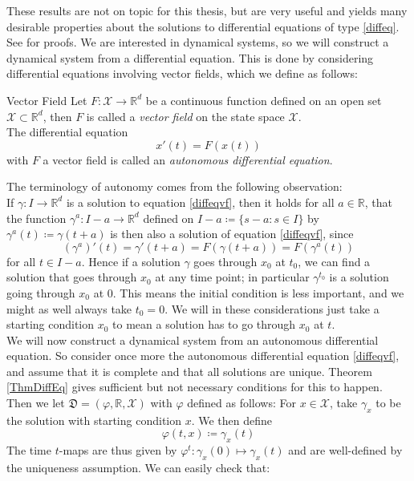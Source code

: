 \documentclass[11pt, a4paper]{memoir}
\theoremstyle{break}
\theoremstyle{break}
\theoremstyle{nonumberplain}
\newcommand{\mR}{\mathbb{R}}
\begin{document}
These results are not on topic for this thesis, but are very useful and yields many desirable properties about the solutions to differential equations of type \ref{diffeq}. See \cite{Dynamics} for proofs. We are interested in dynamical systems, so we will construct a dynamical system from a differential equation. This is done by considering differential equations involving vector fields, which we define as follows:
\begin{mydefinition}{Vector Field}
Let $F:\mathcal{X}\to\mR^d$ be a continuous function defined on an open set $\mathcal{X}\subset \mR^d$, then $F$ is called a \emph{vector field} on the state space $\mathcal{X}$.\\[5pt]
The differential equation
\begin{equation}\label{diffeqvf}
x'(t)=F(x(t))
\end{equation}
with $F$ a vector field is called an \emph{autonomous differential equation}.
\end{mydefinition}
\noindent The terminology of autonomy comes from the following observation:\\
If $\gamma:I\to\mR^d$ is a solution to equation \ref{diffeqvf}, then it holds for all $a\in\mR$, that the function $\gamma^a:I-a\to\mR^d$ defined on $I-a\coloneqq \{s-a: s\in I\}$ by $\gamma^a(t)\coloneqq \gamma(t+a)$ is then also a solution of equation \ref{diffeqvf}, since
$$\left(\gamma^a\right)'(t)=\gamma '(t+a)=F(\gamma(t+a))=F(\gamma^a(t))$$
for all $t\in I-a$. Hence if a solution $\gamma$ goes through $x_0$ at $t_0$, we can find a solution that goes through $x_0$ at any time point; in particular $\gamma^{t_0}$ is a solution going through $x_0$ at $0$. This means the initial condition is less important, and we might as well always take $t_0=0$. We will in these considerations just take a starting condition $x_0$ to mean a solution has to go through $x_0$ at $t$.\\[5pt]
We will now construct a dynamical system from an autonomous differential equation. So consider once more the autonomous differential equation \ref{diffeqvf}, and assume that it is complete and that all solutions are unique. Theorem \ref{ThmDiffEq} gives sufficient but not necessary conditions for this to happen. Then we let $\mathfrak{D}=(\varphi,\mR,\mathcal{X})$ with $\varphi$ defined as follows: For $x\in \mathcal{X}$, take $\gamma_x$ to be the solution with starting condition $x$. We then define
$$\varphi(t,x)\coloneqq \gamma_x(t)$$
The time $t$-maps are thus given by $\varphi^t:\gamma_x(0)\mapsto \gamma_x(t)$ and are well-defined by the uniqueness assumption. We can easily check that:
\end{document}
